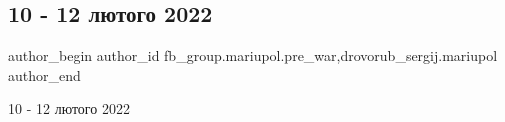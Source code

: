  
 
 
 
 

\subsection{10 - 12 лютого 2022}
\label{sec:13_02_2023.fb.fb_group.mariupol.pre_war.1.10___12_lyutogo_2022}
 
\ifcmt
 author_begin
   author_id fb_group.mariupol.pre_war,drovorub_sergij.mariupol
 author_end
\fi

10 - 12 лютого 2022
